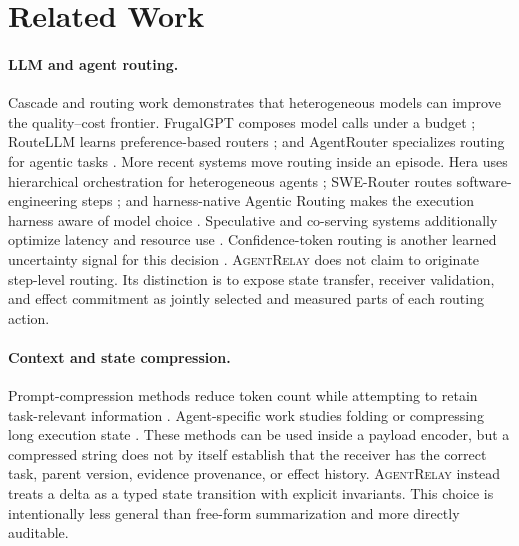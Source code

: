 \documentclass[10pt]{article}
\newcommand{\system}{\textsc{AgentRelay}}
\begin{document}
\section{Related Work}
\label{sec:related}

\paragraph{LLM and agent routing.}
Cascade and routing work demonstrates that heterogeneous models can improve
the quality--cost frontier. FrugalGPT composes model calls under a budget
\citep{chen2024frugalgpt}; RouteLLM learns preference-based routers
\citep{ong2025routellm}; and AgentRouter specializes routing for agentic tasks
\citep{paul2026agentrouter}. More recent systems move routing inside an
episode. Hera uses hierarchical orchestration for heterogeneous agents
\citep{zhang2026hera}; SWE-Router routes software-engineering steps
\citep{son2026swerouter}; and harness-native Agentic Routing makes the
execution harness aware of model choice \citep{liu2026agenticrouting}.
Speculative and co-serving systems additionally optimize latency and resource
use \citep{ye2026speculative,xiang2026scheduler,dekoninck2025unified}.
Confidence-token routing is another learned uncertainty signal for this
decision \citep{chuang2025confidence}.
\system{} does not claim to originate step-level routing. Its distinction is
to expose state transfer, receiver validation, and effect commitment as
jointly selected and measured parts of each routing action.

\paragraph{Context and state compression.}
Prompt-compression methods reduce token count while attempting to retain
task-relevant information \citep{jiang2023llmlingua,jiang2024longllmlingua}.
Agent-specific work studies folding or compressing long execution state
\citep{sun2026contextfolding,sharma2026statecompression}. These methods can be
used inside a payload encoder, but a compressed string does not by itself
establish that the receiver has the correct task, parent version, evidence
provenance, or effect history. \system{} instead treats a delta as a typed
state transition with explicit invariants. This choice is intentionally less
general than free-form summarization and more directly auditable.
\end{document}
